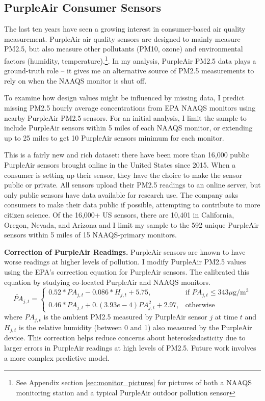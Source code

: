 \documentclass[12pt]{article}
\begin{document}
\subsection{PurpleAir Consumer Sensors}
The last ten years have seen a growing interest in consumer-based air quality measurement. PurpleAir air quality sensors are designed to mainly measure PM2.5, but also measure other pollutants (PM10, ozone) and environmental factors (humidity, temperature).\footnote{See Appendix section \ref{sec:monitor_pictures} for pictures of both a NAAQS monitoring station and a typical PurpleAir outdoor pollution sensor}. In my analysis, PurpleAir PM2.5 data plays a ground-truth role -- it gives me an alternative source of PM2.5 measurements to rely on when the NAAQS monitor is shut off. 

To examine how design values might be influenced by missing data, I predict missing PM2.5 hourly average concentrations from EPA NAAQS monitors using nearby PurpleAir PM2.5 sensors. For an initial analysis, I limit the sample to include PurpleAir sensors within 5 miles of each NAAQS monitor, or extending up to 25 miles to get 10 PurpleAir sensors minimum for each monitor.

This is a fairly new and rich dataset: there have been more than 16,000 public PurpleAir sensors brought online in the United States since 2015. When a consumer is setting up their sensor, they have the choice to make the sensor public or private. All sensors upload their PM2.5 readings to an online server, but only public sensors have data available for research use. The company asks consumers to make their data public if possible, attempting to contribute to more citizen science. Of the 16,000+ US sensors, there are 10,401 in California, Oregon, Nevada, and Arizona and I limit my sample to the 592 unique PurpleAir sensors within 5 miles of 15 NAAQS-primary monitors.

\textbf{Correction of PurpleAir Readings.} PurpleAir sensors are known to have worse readings at higher levels of pollution. I modify PurpleAir PM2.5 values using the EPA's correction equation for PurpleAir sensors. The calibrated this equation by studying co-located PurpleAir and NAAQS monitors.
$$
\widetilde{PA}_{j,t}=\begin{cases}
			0.52*PA_{j,t} - 0.086*H_{j,t} + 5.75, & \text{if $PA_{j,t} \leq 343 \mu$g/m$^3$}\\
            0.46*PA_{j,t} + 0.(3.93e-4)PA_{j,t}^2 + 2.97, & \text{otherwise}
		 \end{cases}
$$
where $PA_{j,t}$ is the ambient PM2.5 measured by PurpleAir sensor $j$ at time $t$ and $H_{j,t}$ is the relative humidity (between 0 and 1) also measured by the PurpleAir device. This correction helps reduce concerns about heteroskedasticity due to larger errors in PurpleAir readings at high levels of PM2.5. Future work involves a more complex predictive model.
\end{document}
